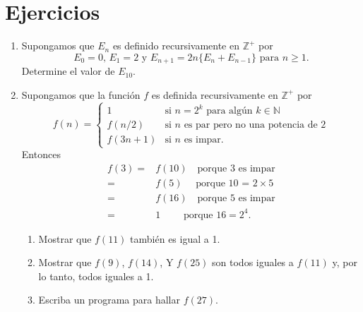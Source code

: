 \documentclass[12pt, a4paper]{book}
\begin{document}
\section{Ejercicios} %
\begin{enumerate}
    \item Supongamos que $E_n$ es definido recursivamente en $\mathbb{Z}^+$ por $$E_0=0,\, E_1=2\,\, \text{y} \,\,E_{n+1}=2n\{E_n+E_{n-1}\}\,\, \text{para} \,\, n\geq 1.$$ Determine el valor de $E_{10}$.
    \item Supongamos que la función $f$ es definida recursivamente en $\mathbb{Z}^+$ por \[
f(n)=\begin{cases} 
1 & \text{si }n=2^k\text{ para algún }k \in \mathbb{N}\\ f(n/2) & \text{si }n\text{ es par pero no una potencia de 2} \\ f(3n+1) & \text{si }n\text{ es impar.}
\end{cases}
\]
Entonces 
\begin{align*}
  f(3)=&f(10)\quad \text{porque 3 es impar} \\
  =&f(5)\quad \text{  porque 10 = 2} \times 5\\
  =&f(16)\quad \text{porque 5 es impar}\\
  =&1\quad\quad\text{ porque 16} = 2^4.
\end{align*}

\begin{enumerate}
    \item Mostrar que $f(11)$ también es igual a 1.
    \item Mostrar que $f(9)$, $f(14)$, Y $f(25)$ son todos iguales a $f(11)$ y, por lo tanto, todos iguales a 1.
    \item Escriba un programa para hallar $f(27)$.
\end{enumerate}


\end{enumerate}
\end{document}

